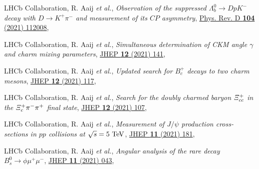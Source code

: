 \begin{cvcontent}
  \begin{enumerate}[label={[\arabic*]}, leftmargin=1.5cm]
    \item LHCb Collaboration, R. Aaij \emph{et al.}, 
    \emph{Observation of the suppressed $\Lambda_b^0\to D p K^-$ decay with $D\to K^+ \pi^-$ and measurement of its $C\!P$ asymmetry}, 
    \href{https://link.aps.org/doi/10.1103/PhysRevD.104.112008}{Phys. Rev. D \textbf{104} (2021) 112008},
    \item LHCb Collaboration, R. Aaij \emph{et al.}, 
    \emph{Simultaneous determination of CKM angle $\gamma$ and charm mixing parameters},
    \href{https://doi.org/10.1007/JHEP12(2021)141}{JHEP \textbf{12} (2021) 141},
    \sloppy
    \item LHCb Collaboration, R. Aaij \emph{et al.}, 
    \emph{Updated search for $B_c^+$ decays to two charm mesons},
    \href{https://doi.org/10.1007/JHEP12(2021)117}{JHEP \textbf{12} (2021) 117},
    \item LHCb Collaboration, R. Aaij \emph{et al.}, 
    \emph{Search for the doubly charmed baryon $\it{\Xi}_{cc}^{+}$ in the $\it{\Xi}_{c}^{+} \pi^{-} \pi^{+}$ final state},
    \href{https://doi.org/10.1007/JHEP12(2021)107}{JHEP \textbf{12} (2021) 107},
    \item LHCb Collaboration, R. Aaij \emph{et al.}, 
    \emph{Measurement of $J/\psi$ production cross-sections in $pp$ collisions at $\sqrt{s}=5~\rm{TeV}$},
    \href{http://dx.doi.org/10.1007/JHEP11(2021)181}{JHEP \textbf{11} (2021) 181},
    \sloppy
    \item LHCb Collaboration, R. Aaij \emph{et al.}, 
    \emph{Angular analysis of the rare decay $B_s^0 \to \phi \mu^+ \mu^-$},
    \href{http://dx.doi.org/10.1007/JHEP11(2021)043}{JHEP \textbf{11} (2021) 043},
  \end{enumerate}
\end{cvcontent}